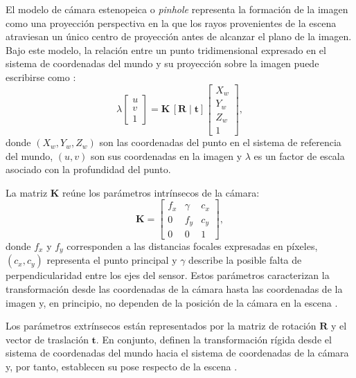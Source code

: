 \documentclass{report}
\begin{document}
El modelo de cámara estenopeica o \emph{pinhole} representa la formación de la imagen como una proyección perspectiva en la que los rayos provenientes de la escena atraviesan un único centro de proyección antes de alcanzar el plano de la imagen. Bajo este modelo, la relación entre un punto tridimensional expresado en el sistema de coordenadas del mundo y su proyección sobre la imagen puede escribirse como \parencite{Hartley2004,Zhang2000}:
\begin{equation}
\lambda \begin{bmatrix} u \\ v \\ 1 \end{bmatrix} = \mathbf{K}\,[\mathbf{R} \mid \mathbf{t}]\begin{bmatrix} X_w \\ Y_w \\ Z_w \\ 1 \end{bmatrix},
\label{eq:pinhole}
\end{equation}
donde $(X_w, Y_w, Z_w)$ son las coordenadas del punto en el sistema de referencia del mundo, $(u, v)$ son sus coordenadas en la imagen y $\lambda$ es un factor de escala asociado con la profundidad del punto.

La matriz $\mathbf{K}$ reúne los parámetros intrínsecos de la cámara:
\begin{equation}
\mathbf{K} = \begin{bmatrix} f_x & \gamma & c_x \\ 0 & f_y & c_y \\ 0 & 0 & 1 \end{bmatrix},
\label{eq:K}
\end{equation}
donde $f_x$ y $f_y$ corresponden a las distancias focales expresadas en píxeles, $(c_x, c_y)$ representa el punto principal y $\gamma$ describe la posible falta de perpendicularidad entre los ejes del sensor. Estos parámetros caracterizan la transformación desde las coordenadas de la cámara hasta las coordenadas de la imagen y, en principio, no dependen de la posición de la cámara en la escena \parencite{Hartley2004}.

Los parámetros extrínsecos están representados por la matriz de rotación $\mathbf{R}$ y el vector de traslación $\mathbf{t}$. En conjunto, definen la transformación rígida desde el sistema de coordenadas del mundo hacia el sistema de coordenadas de la cámara y, por tanto, establecen su pose respecto de la escena \parencite{Hartley2004,Zhang2000}.
\end{document}
